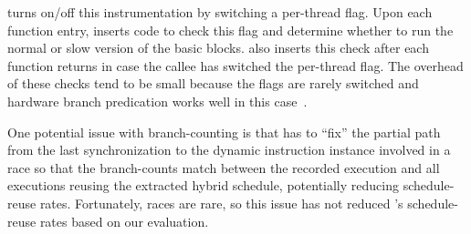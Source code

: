 \peregrine turns on/off this instrumentation by switching a per-thread flag.
Upon each function entry, \peregrine inserts code to check this flag and
determine whether to run the normal or slow version of the basic blocks.
\peregrine also inserts this check after each function returns in case the
callee has switched the per-thread flag.  The overhead of these checks
tend to be small because the flags are rarely switched 
and hardware branch predication works well in this case~\cite{wu:loom:osdi10}.


One potential issue with branch-counting is that \peregrine has to
``fix'' the partial path from the last synchronization to the dynamic
instruction instance involved in a race so that the branch-counts match
between the recorded execution and all executions
reusing the extracted hybrid schedule, potentially reducing schedule-reuse rates.
Fortunately, races are rare, so this issue has not reduced \peregrine's
schedule-reuse rates based on our evaluation.





